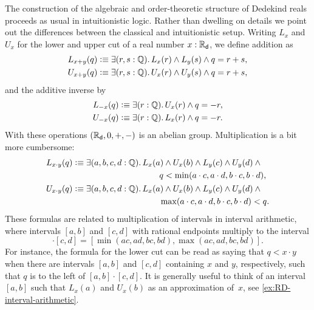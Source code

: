 The construction of the algebraic and order-theoretic structure of Dedekind reals proceeds
as usual in intuitionistic logic. Rather than dwelling on details we point out the
differences between the classical and intuitionistic setup. Writing $L_x$ and $U_x$ for
the lower and upper cut of a real number $x : \mathbb{R}_\mathsf{d}$, we define addition as%
%
%
\begin{align*}
  L_{x + y}(q) &\defeq \exis{r, s : \Q} L_x(r) \land L_y(s) \land q = r + s, \\
  U_{x + y}(q) &\defeq \exis{r, s : \Q} U_x(r) \land U_y(s) \land q = r + s,
\end{align*}
%
and the additive inverse by
%
\begin{align*}
  L_{-x}(q) &\defeq \exis{r : \Q} U_x(r) \land q = - r, \\
  U_{-x}(q) &\defeq \exis{r : \Q} L_x(r) \land q = - r.
\end{align*}
%
With these operations $(\mathbb{R}_\mathsf{d}, 0, {+}, {-})$ is an abelian group. Multiplication is a bit
more cumbersome:
%
%
\begin{align*}
  L_{x \cdot y}(q) &\defeq
  \begin{aligned}[t]
    \exis{a, b, c, d : \Q} & L_x(a) \land U_x(b) \land L_y(c) \land U_y(d) \land {}\\
                           & \qquad q < \min (a \cdot c, a \cdot d, b \cdot c, b \cdot d),
  \end{aligned} \\
  U_{x \cdot y}(q) &\defeq
  \begin{aligned}[t]
    \exis{a, b, c, d : \Q} & L_x(a) \land U_x(b) \land L_y(c) \land U_y(d) \land {}\\
                           & \qquad \max (a \cdot c, a \cdot d, b \cdot c, b \cdot d) < q.
  \end{aligned}
\end{align*}
%
%
These formulas are related to multiplication of intervals in interval arithmetic, where
intervals $[a,b]$ and $[c,d]$ with rational endpoints multiply to the interval
%
\begin{equation*}
  [a,b] \cdot [c,d] =
  [\min(a c, a d, b c, b d), \max(a c, a d, b c, b d)].
\end{equation*}
%
For instance, the formula for the lower cut can be read as saying that $q < x \cdot y$
when there are intervals $[a,b]$ and $[c,d]$ containing $x$ and $y$, respectively, such
that $q$ is to the left of $[a,b] \cdot [c,d]$. It is generally useful to think of an
interval $[a,b]$ such that $L_x(a)$ and $U_x(b)$ as an approximation of~$x$, see
\cref{ex:RD-interval-arithmetic}.

